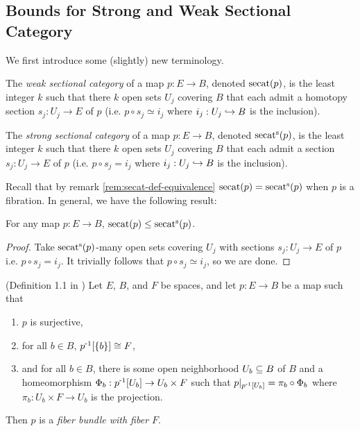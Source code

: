 \subsection{Bounds for Strong and Weak Sectional Category}\label{sec:secat-bounds}
We first introduce some (slightly) new terminology.

\begin{definition}
    The \emph{weak sectional category} of a map $p : E \to B$, denoted $\operatorname{secat}(p)$, is the least integer $k$ such that there $k$ open sets $U_j$ covering $B$ that each admit a homotopy section $s_j : U_j \to E$ of $p$ (i.e. $p \circ s_j \simeq i_j$ where $i_j : U_j \hookrightarrow B$ is the inclusion).
\end{definition}

\begin{definition}
    The \emph{strong sectional category} of a map $p : E \to B$, denoted $\operatorname{secat^s}(p)$, is the least integer $k$ such that there $k$ open sets $U_j$ covering $B$ that each admit a section $s_j : U_j \to E$ of $p$ (i.e. $p \circ s_j = i_j$ where $i_j : U_j \hookrightarrow B$ is the inclusion).
\end{definition}

Recall that by remark \ref{rem:secat-def-equivalence} $\operatorname{secat}(p) = \operatorname{secat^s}(p)$ when $p$ is a fibration.
In general, we have the following result:

\begin{lemma}\label{lem:secat-leq-ssecat}
    For any map $p : E \to B$, $\operatorname{secat}(p) \leq \operatorname{secat^s}(p)$.
    \begin{proof}
        Take $\operatorname{secat^s}(p)$-many open sets covering $U_j$ with sections $s_j : U_j \to E$ of $p$ i.e. $p \circ s_j = i_j$.
        It trivially follows that $p \circ s_j \simeq i_j$, so we are done.
    \end{proof}
\end{lemma}

\begin{definition}
    (Definition 1.1 in \cite{cohentopologyoffiberbundles})
    Let $E$, $B$, and $F$ be spaces, and let $p : E \to B$ be a map such that
    \begin{enumerate}
        \item $p$ is surjective,
        \item for all $b \in B$, $p^{\text{-}1}[\left\{ b \right\}] \cong F$,
        \item and for all $b \in B$, there is some open neighborhood $U_b \subseteq B$ of $B$ and a homeomorphism $\Phi_b : p^{\text{-}1}[U_b] \to U_b \times F$ such that $p|_{p^{\text{-}1}[U_b]} = \pi_b \circ \Phi_b$ where $\pi_b : U_b \times F \to U_b$ is the projection.
    \end{enumerate}
    Then $p$ is a \emph{fiber bundle with fiber $F$}.
\end{definition}

